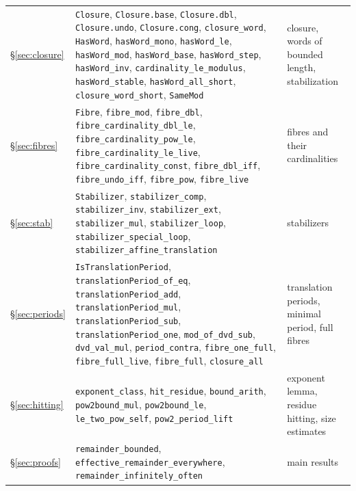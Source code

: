 \documentclass[11pt,reqno,oneside]{amsart}
\theoremstyle{plain}
\theoremstyle{definition}
\numberwithin{equation}{section}
\newcommand{\lean}[1]{\texttt{#1}}
\begin{document}
{\begin{longtable}{@{}>{\raggedright\arraybackslash}p{}>{\raggedright\arraybackslash}p{}>{\raggedright\arraybackslash}p{}@{}}
\S\ref{sec:closure} & \lean{Closure}, \lean{Closure.base}, \lean{Closure.dbl}, \lean{Closure.undo}, \lean{Closure.cong}, \lean{closure\_\allowbreak{}word}, \lean{HasWord}, \lean{hasWord\_\allowbreak{}mono}, \lean{hasWord\_\allowbreak{}le}, \lean{hasWord\_\allowbreak{}mod}, \lean{hasWord\_\allowbreak{}base}, \lean{hasWord\_\allowbreak{}step}, \lean{hasWord\_\allowbreak{}inv}, \lean{cardinality\_\allowbreak{}le\_\allowbreak{}modulus}, \lean{hasWord\_\allowbreak{}stable}, \lean{hasWord\_\allowbreak{}all\_\allowbreak{}short}, \lean{closure\_\allowbreak{}word\_\allowbreak{}short}, \lean{SameMod} & closure, words of bounded length, stabilization \\
\S\ref{sec:fibres} & \lean{Fibre}, \lean{fibre\_\allowbreak{}mod}, \lean{fibre\_\allowbreak{}dbl}, \lean{fibre\_\allowbreak{}cardinality\_\allowbreak{}dbl\_\allowbreak{}le}, \lean{fibre\_\allowbreak{}cardinality\_\allowbreak{}pow\_\allowbreak{}le}, \lean{fibre\_\allowbreak{}cardinality\_\allowbreak{}le\_\allowbreak{}live}, \lean{fibre\_\allowbreak{}cardinality\_\allowbreak{}const}, \lean{fibre\_\allowbreak{}dbl\_\allowbreak{}iff}, \lean{fibre\_\allowbreak{}undo\_\allowbreak{}iff}, \lean{fibre\_\allowbreak{}pow}, \lean{fibre\_\allowbreak{}live} & fibres and their cardinalities \\
\S\ref{sec:stab} & \lean{Stabilizer}, \lean{stabilizer\_\allowbreak{}comp}, \lean{stabilizer\_\allowbreak{}inv}, \lean{stabilizer\_\allowbreak{}ext}, \lean{stabilizer\_\allowbreak{}mul}, \lean{stabilizer\_\allowbreak{}loop}, \lean{stabilizer\_\allowbreak{}special\_\allowbreak{}loop}, \lean{stabilizer\_\allowbreak{}affine\_\allowbreak{}translation} & stabilizers \\
\S\ref{sec:periods} & \lean{IsTranslationPeriod}, \lean{translationPeriod\_\allowbreak{}of\_\allowbreak{}eq}, \lean{translationPeriod\_\allowbreak{}add}, \lean{translationPeriod\_\allowbreak{}mul}, \lean{translationPeriod\_\allowbreak{}sub}, \lean{translationPeriod\_\allowbreak{}one}, \lean{mod\_\allowbreak{}of\_\allowbreak{}dvd\_\allowbreak{}sub}, \lean{dvd\_\allowbreak{}val\_\allowbreak{}mul}, \lean{period\_\allowbreak{}contra}, \lean{fibre\_\allowbreak{}one\_\allowbreak{}full}, \lean{fibre\_\allowbreak{}full\_\allowbreak{}live}, \lean{fibre\_\allowbreak{}full}, \lean{closure\_\allowbreak{}all} & translation periods, minimal period, full fibres \\
\S\ref{sec:hitting} & \lean{exponent\_\allowbreak{}class}, \lean{hit\_\allowbreak{}residue}, \lean{bound\_\allowbreak{}arith}, \lean{pow2bound\_\allowbreak{}mul}, \lean{pow2bound\_\allowbreak{}le}, \lean{le\_\allowbreak{}two\_\allowbreak{}pow\_\allowbreak{}self}, \lean{pow2\_\allowbreak{}period\_\allowbreak{}lift} & exponent lemma, residue hitting, size estimates \\
\S\ref{sec:proofs} & \lean{remainder\_\allowbreak{}bounded}, \lean{effective\_\allowbreak{}remainder\_\allowbreak{}everywhere}, \lean{remainder\_\allowbreak{}infinitely\_\allowbreak{}often} & main results \\
\bottomrule
\end{longtable}
}
\end{document}

